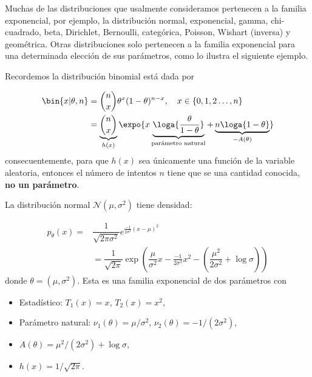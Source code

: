 Muchas de las distribuciones que usalmente consideramos pertenecen a la familia exponencial, por ejemplo, la distribución normal, exponencial, gamma, chi-cuadrado, beta, Dirichlet, Bernoulli, categórica, Poisson, Wishart (inversa) y geométrica. Otras distribuciones solo pertenecen a la familia exponencial para una determinada elección de sus parámetros, como lo ilustra el siguiente ejemplo.

\begin{example}
Recordemos la distribución binomial está dada por 

\begin{align*}
	\bin{x|\theta,n} 	&=\binom{n}{x}\theta^x(1-\theta)^{n-x},\quad x\in\{0,1,2\ldots,n\}\\
					&=
					\underbrace{\binom{n}{x}}_{h(x)}\expo{x\underbrace{\loga{\frac{\theta}{1-\theta}}}_{\text{parámetro natural}} + \underbrace{n\loga{1-\theta}}_{-{A(\theta)}}}\\
\end{align*}
consecuentemente, para que $h(x)$ sea únicamente una función de la variable aleatoria, entonces el número de intentos $n$ tiene que se una cantidad conocida, \textbf{no un parámetro}. 	
 \end{example} 

\begin{example} 
La distribución normal $\mathcal{N}(\mu,\sigma^{2})$ tiene densidad:

\begin{align}
    p_{\theta}(x) = &  \dfrac{1}{\sqrt{2\pi \sigma^{2}}} e^{\frac{-1}{2\sigma^{2}}(x-\mu)^{2}}\\
    & = \dfrac{1}{\sqrt{2\pi}}\exp\left(\dfrac{\mu}{\sigma^{2}}x -\frac{-1}{2\sigma^{2}}x^{2} - \left(\dfrac{\mu^{2}}{2\sigma^{2}} + \log \sigma \right)\right)
\end{align}
donde $\theta = (\mu, \sigma^{2})$. Esta es una familia exponencial de dos parámetros con
\begin{itemize}
    \item Estadístico: $T_{1}(x) = x$, $T_{2} (x) = x^2$,
    \item Parámetro natural: $\nu_{1}(\theta) = \mu/\sigma^{2}$, $\nu_{2}(\theta) = -1/(2\sigma^{2})$,
    \item $A(\theta) = \mu^{2}/(2\sigma^{2}) + \log \sigma $,
    \item $h(x) = 1/\sqrt{2\pi}$.
\end{itemize}  

\end{example}

